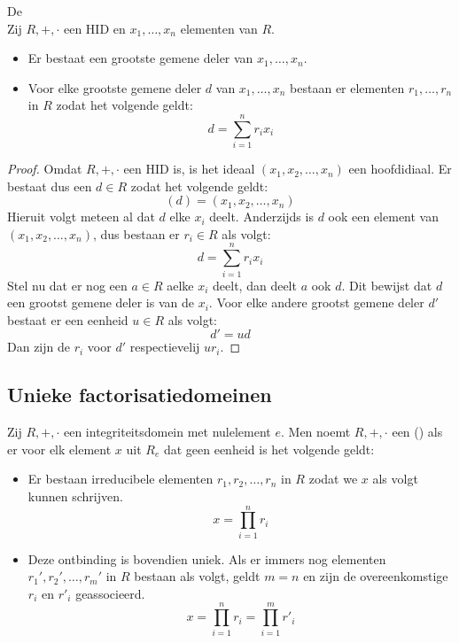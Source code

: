 \documentclass[main.tex]{subfiles}
\begin{document}
\begin{st}
  \label{st:stelling-van-bezout}
  De \\
  Zij $R,+,\cdot$ een HID en $x_{1},\dotsc,x_{n}$ elementen van $R$.
  \begin{itemize}
  \item Er bestaat een grootste gemene deler van $x_{1},\dotsc,x_{n}$.
  \item Voor elke grootste gemene deler $d$ van $x_{1},\dotsc,x_{n}$ bestaan er elementen $r_{1},\dotsc,r_{n}$ in $R$ zodat het volgende geldt:
    \[ d = \sum_{i=1}^{n}r_{i}x_{i} \]
  \end{itemize}

  \begin{proof}
    Omdat $R,+,\cdot$ een HID is, is het ideaal $(x_{1},x_{2},\dotsc,x_{n})$ een hoofdidiaal.
    Er bestaat dus een $d\in R$ zodat het volgende geldt:
    \[ (d) = (x_{1},x_{2},\dotsc,x_{n}) \]
    Hieruit volgt meteen al dat $d$ elke $x_{i}$ deelt.
    Anderzijds is $d$ ook een element van $(x_{1},x_{2},\dotsc,x_{n})$, dus bestaan er $r_{i} \in R$ als volgt:
    \[ d = \sum_{i=1}^{n}r_{i}x_{i} \]
    Stel nu dat er nog een $a\in R$ aelke $x_{i}$ deelt, dan deelt $a$ ook $d$.
    Dit bewijst dat $d$ een grootst gemene deler is van de $x_{i}$.
    Voor elke andere grootst gemene deler $d'$ bestaat er een eenheid $u\in R$ als volgt:\waarom
    \[ d' = ud \]
    Dan zijn de $r_{i}$ voor $d'$ respectievelij $ur_{i}$.
  \end{proof}
\end{st}

\subsection{Unieke factorisatiedomeinen}
\label{sec:unieke-fact}

\begin{de}
  Zij $R,+,\cdot$ een integriteitsdomein met nulelement $e$.
  Men noemt $R,+,\cdot$ een  () als er voor elk element $x$ uit $R_{e}$ dat geen eenheid is het volgende geldt:
  \begin{itemize}
  \item Er bestaan irreducibele elementen $r_{1},r_{2},\dotsc,r_{n}$ in $R$ zodat we $x$ als volgt kunnen schrijven.
    \[ x = \prod_{i=1}^{n} r_{i} \]
  \item Deze ontbinding is bovendien uniek.
    Als er immers nog elementen $r_{1}',r_{2}',\dotsc,r_{m}'$ in $R$ bestaan als volgt, geldt $m=n$ en zijn de overeenkomstige $r_{i}$ en $r'_{i}$ geassocieerd.
    \[ x = \prod_{i=1}^{n} r_{i} = \prod_{i=1}^{m} r'_{i} \]
  \end{itemize}
\end{de}
\end{document}
